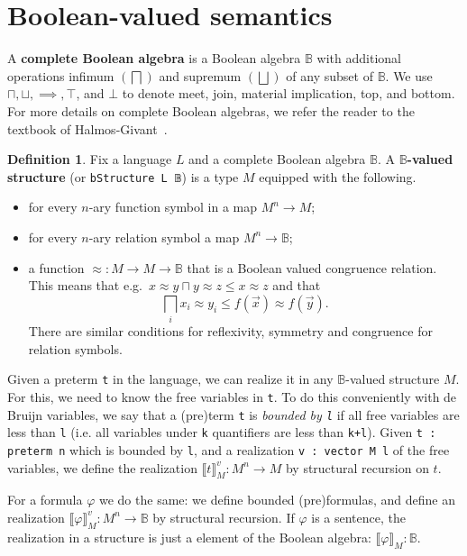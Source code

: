 \documentclass[sigplan,10pt,review, anonymous]{acmart}
\newcommand{\B}{\mathbb{B}}
\newcommand{\lil}{\lstinline}
\theoremstyle{definition}
\newtheorem{defn}{Definition}[section]
\begin{document}
\section{Boolean-valued semantics}
\label{sect:boolean-semantics}
A \textbf{complete Boolean algebra} is a Boolean algebra $\B$ with additional operations infimum $(\bigsqcap)$ and supremum $(\bigsqcup)$ of any subset of $\B$.
We use $\sqcap, \sqcup, \implies, \top$, and $\bot$ to denote meet, join, material implication, top, and bottom. For more details on complete Boolean algebras, we refer the reader to the textbook of Halmos-Givant~\cite{givant2008introduction}.

\begin{defn}\label{def:boolean-valued-structure}
  Fix a language $L$ and a complete Boolean algebra $\B$. A \textbf{$\B$-valued structure} (or \lil{bStructure L 𝔹}) is a type $M$ equipped with the following.
  \begin{itemize}
    \item for every $n$-ary function symbol in a map $M^n \to M$;
    \item for every $n$-ary relation symbol a map $M^n \to \B$;
    \item a function ${\approx}:M\to M\to\B$ that is a Boolean valued congruence relation. This means that e.g.\
    $x\approx y\sqcap y\approx z\le x\approx z$ and that \[\bigsqcap_i x_i\approx y_i \le f(\vec x)\approx f(\vec y).\]
    There are similar conditions for reflexivity, symmetry and congruence for relation symbols.
  \end{itemize}
\end{defn}

Given a preterm \lil{t} in the language, we can realize it in any $\B$-valued structure $M$.
For this, we need to know the free variables in \lil{t}.
To do this conveniently with de Bruijn variables, we say that a (pre)term \lil{t} is \emph{bounded by \lil{l}} if all free variables are less than \lil{l} (i.e. all variables under \lil{k} quantifiers are less than \lil{k+l}).
Given \lil{t : preterm n} which is bounded by \lil{l}, and a realization \lil{v : vector M l} of the free variables, we define the realization $\llbracket t \rrbracket_M^v : M^n \to M$ by structural recursion on $t$.

For a formula $\varphi$ we do the same: we define bounded (pre)formulas, and define an realization $\llbracket \varphi \rrbracket_M^v : M^n \to \B$ by structural recursion.
If $\varphi$ is a sentence, the realization in a structure is just a element of the Boolean algebra: $\llbracket \varphi \rrbracket_M : \B$.
\end{document}
